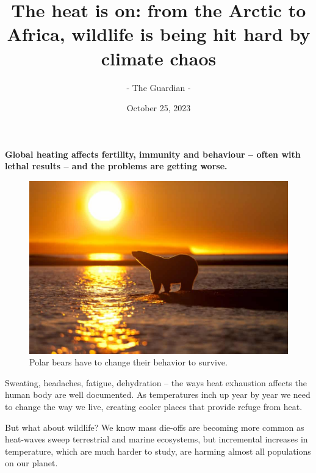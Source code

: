 \documentclass[12pt, a4paper]{article}
\title{The heat is on: from the Arctic to Africa, wildlife is being hit hard by climate chaos}
\author{- The Guardian -}
\date{October 25, 2023}
\begin{document}
\maketitle
\thispagestyle{fancy}

\begin{center}
    \begin{minipage}{0.8\textwidth}
        \noindent
        \textbf{Global heating affects fertility, immunity and behaviour – often with lethal results – and the problems are getting worse.}
    \end{minipage}
\end{center}

\begin{figure}[h!]
    \centering
    \includegraphics[width=0.7\linewidth]{polar_bear.jpg}
    \caption{Polar bears have to change their behavior to survive.}
    \label{fig:polar_bear}
\end{figure}

Sweating, headaches, fatigue, dehydration – the ways heat exhaustion affects the human body are well documented. As temperatures inch up year by year we need to change the way we live, creating cooler places that provide refuge from heat.

But what about wildlife? We know mass die-offs are becoming more common as heat-waves sweep terrestrial and marine ecosystems, but incremental increases in temperature, which are much harder to study, are harming almost all populations on our planet.
\end{document}
